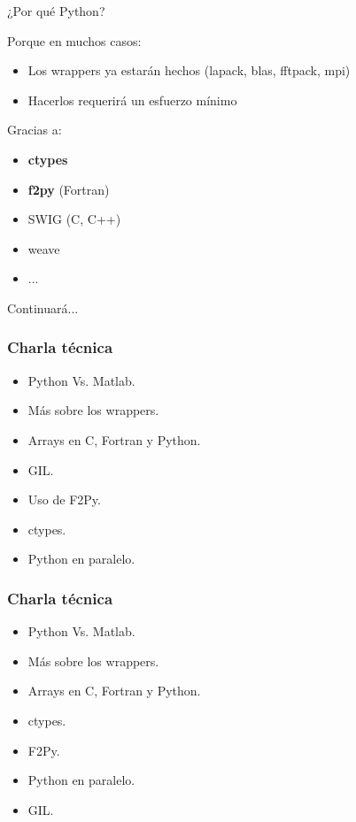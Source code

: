 \documentclass{beamer}
\begin{document}
\begin{frame}
 \begin{center}
  \begin{Huge}
   ¿Por qué Python?
  \end{Huge}
\end{center}
\end{frame}

\begin{frame}
 Porque en muchos casos:
\begin{itemize}
 \item Los wrappers ya estarán hechos (lapack, blas, fftpack, mpi)
 \item Hacerlos requerirá un esfuerzo mínimo
\end{itemize}
Gracias a:
\begin{itemize}
 \item \textbf{ctypes}
 \item \textbf{f2py} (Fortran)
 \item SWIG (C, C++)
 \item weave
 \item ...
\end{itemize}
\end{frame}

\begin{frame}
\begin{center}
 \begin{Huge}
  Continuará...
 \end{Huge}
\end{center}
\end{frame}

\begin{frame}
 \frametitle{Charla técnica}
\begin{itemize}
 \item Python Vs. Matlab.
 \item Más sobre los wrappers.
 \item Arrays en C, Fortran y Python.
 \item GIL.
 \item Uso de F2Py.
 \item ctypes.
 \item Python en paralelo.
\end{itemize}

\end{frame}


\begin{frame}
 \frametitle{Charla técnica}
\begin{itemize}
 \item Python Vs. Matlab.
 \item Más sobre los wrappers.
 \item Arrays en C, Fortran y Python.
 \item ctypes.
 \item F2Py.
 \item Python en paralelo.
 \item GIL.
\end{itemize}

\end{frame}
\end{document}
